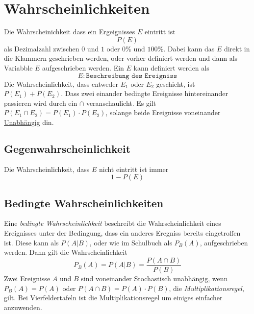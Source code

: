 \documentclass{article}
\begin{document}
 
\section{Wahrscheinlichkeiten} 
Die Wahrscheinichkeit dass ein Ergeignisses $E$ eintritt ist
\[
 P(E) 
\]
als Dezimalzahl zwischen $0$ und $1$ oder $0\%$ und $100\%$. Dabei kann das $E$ direkt in die Klammern geschrieben werden, oder vorher definiert werden und dann als Variabble $E$ aufgeschrieben werden. Ein $E$ kann definiert werden als
\[
 E : \texttt{Beschreibung des Ereigniss} 
\]
Die Wahrscheinlichkeit, dass entweder $E_1$ oder $E_2$ geschieht, ist $P(E_1) + P(E_2)$. Dass zwei einander bedingte Ereignisse hintereinander passieren wird durch ein $\cap$ veranschaulicht. Es gilt $P(E_1 \cap E_2) = P(E_1) \cdot P(E_2)$, solange beide Ereignisse voneinander \hyperref[Unabhängigkeiten]{Unabhängig} din.
 
\subsection{Gegenwahrscheinlichkeit}
Die Wahrscheinlichkeit, dass $E$ nicht eintritt ist immer
\[
 1 - P(E) 
\] 
 
\subsection{Bedingte Wahrscheinlichkeiten}
Eine \emph{bedingte Wahrscheinlichkeit} beschreibt die Wahrscheinlichkeit eines Ereignisses unter der Bedingung, dass ein anderes Eregniss bereits eingetroffen ist. Diese kann als $P(A|B)$, oder wie im Schulbuch als $P_B(A)$, aufgeschrieben werden. Dann gilt die Wahrscheinlichkeit 
\[ 
 P_B(A) = P(A|B) = \frac{P(A \cap B)}{P(B)}
\] 
Zwei Ereignisse $A$ und $B$ sind voneinander Stochastisch unabhängig, wenn $P_B(A)=P(A)$ oder $P(A \cap B) = P(A) \cdot P(B)$, die \emph{Multiplikationsregel}, gilt. Bei Vierfeldertafeln ist die Multiplikationsregel um einiges einfacher anzuwenden. 
\end{document}
